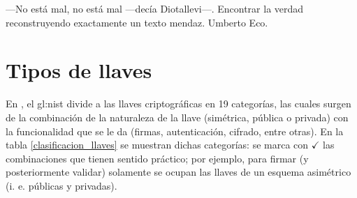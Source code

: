 %
%

\label{sec:administracion_llaves}
{%
  ---No está mal, no está mal ---decía Diotallevi---. Encontrar la verdad
  reconstruyendo exactamente un texto mendaz.%
}
{%
  Umberto Eco.%
}


\section{Tipos de llaves}

En \cite{nist_llaves}, el \gls{gl:nist} divide a las llaves criptográficas en
19 categorías, las cuales surgen de la combinación de la naturaleza de la
llave (simétrica, pública o privada) con la funcionalidad que se le da
(firmas, autenticación, cifrado, entre otras). En la tabla
\ref{clasificacion_llaves} se muestran dichas categorías: se marca con
$ \checkmark $ las combinaciones que tienen sentido práctico; por ejemplo, para
firmar (y posteriormente validar) solamente se ocupan las llaves de un esquema
asimétrico (i. e. públicas y privadas).

